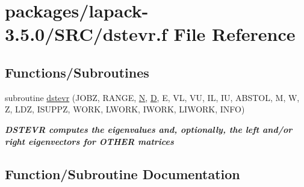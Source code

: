 \hypertarget{dstevr_8f}{}\section{packages/lapack-\/3.5.0/\+S\+R\+C/dstevr.f File Reference}
\label{dstevr_8f}
\subsection*{Functions/\+Subroutines}
\begin{DoxyCompactItemize}
\item 
subroutine \hyperlink{dstevr_8f_a323734560b8bd052fbc474dc2f0b5605}{dstevr} (J\+O\+B\+Z, R\+A\+N\+G\+E, \hyperlink{polmisc_8c_a0240ac851181b84ac374872dc5434ee4}{N}, \hyperlink{odrpack_8h_a7dae6ea403d00f3687f24a874e67d139}{D}, E, V\+L, V\+U, I\+L, I\+U, A\+B\+S\+T\+O\+L, M, W, Z, L\+D\+Z, I\+S\+U\+P\+P\+Z, W\+O\+R\+K, L\+W\+O\+R\+K, I\+W\+O\+R\+K, L\+I\+W\+O\+R\+K, I\+N\+F\+O)
\begin{DoxyCompactList}\small\item\em {\bfseries  D\+S\+T\+E\+V\+R computes the eigenvalues and, optionally, the left and/or right eigenvectors for O\+T\+H\+E\+R matrices} \end{DoxyCompactList}\end{DoxyCompactItemize}


\subsection{Function/\+Subroutine Documentation}
\hypertarget{dstevr_8f_a323734560b8bd052fbc474dc2f0b5605}{}
